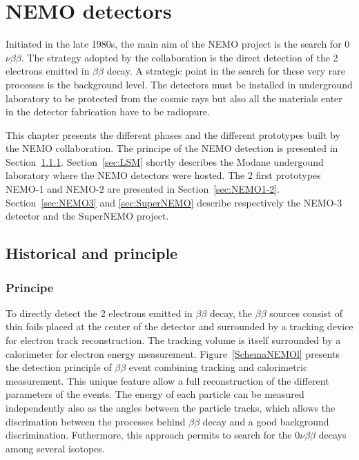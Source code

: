 \documentclass[main.tex]{subfiles}
\begin{document}
\chapter{NEMO detectors}


\NI Initiated in the late 1980s, the main aim of the NEMO project is the search for 0$\nu\beta\beta$. The strategy adopted by the collaboration is the direct detection of the 2 electrons emitted in $\beta\beta$ decay. A strategic point in the search for these very rare processes is the background level. The detectors must be installed in underground laboratory to be protected from the cosmic rays but also all the materials enter in the detector fabrication have to be radiopure.


\bigskip


\NI This chapter presents the different phases and the different prototypes built by the NEMO collaboration. The principe of the NEMO detection is presented in Section~\ref{sec:Principe}. Section~\ref{sec:LSM} shortly describes the Modane undergound laboratory where the NEMO detectors were hosted. The 2 first prototypes NEMO-1 and NEMO-2 are presented in Section~\ref{sec:NEMO1-2}. Section~\ref{sec:NEMO3} and \ref{sec:SuperNEMO} describe respectively the NEMO-3 detector and the SuperNEMO project.


\section{Historical and principle}


\subsection{Principe}\label{sec:Principe}


To directly detect the 2 electrons emitted in $\beta\beta$ decay, the $\beta\beta$ sources consist of thin foils placed at the center of the detector and surrounded by a tracking device for electron track reconstruction. The tracking volume is itself surrounded by a calorimeter for electron energy measurement. Figure~\ref{SchemaNEMOl} presents the detection principle of $\beta\beta$ event combining tracking and calorimetric measurement. This unique feature allow a full reconstruction of the different parameters of the events. The energy of each particle can be measured independently also as the angles between the particle tracks, which allows the discrimation between the processes behind $\beta\beta$ decay and a good background discrimination. Futhermore, this approach permits to search for the 0$\nu\beta\beta$ decays among several isotopes. 
\end{document}
